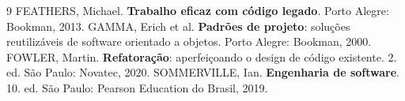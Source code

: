 \begin{thebibliography}{9}\small
{} FEATHERS, Michael. \textbf{Trabalho eficaz com c\'odigo legado}. Porto Alegre: Bookman, 2013.
 GAMMA, Erich et al. \textbf{Padr\~oes de projeto}: solu\c{c}\~oes reutiliz\'aveis de software orientado a objetos. Porto Alegre: Bookman, 2000.
 FOWLER, Martin. \textbf{Refatora\c{c}\~ao}: aperfei\c{c}oando o design de c\'odigo existente. 2. ed. S\~ao Paulo: Novatec, 2020.
 SOMMERVILLE, Ian. \textbf{Engenharia de software}. 10. ed. S\~ao Paulo: Pearson Education do Brasil, 2019.
\end{thebibliography}

